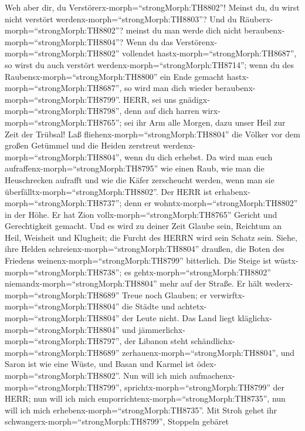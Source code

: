  Weh aber dir, du Verstörerx-morph=``strongMorph:TH8802''!
Meinst du, du wirst nicht verstört werdenx-morph=``strongMorph:TH8803''?
Und du Räuberx-morph=``strongMorph:TH8802''? meinst du man werde dich
nicht beraubenx-morph=``strongMorph:TH8804''? Wenn du das
Verstörenx-morph=``strongMorph:TH8802'' vollendet
hastx-morph=``strongMorph:TH8687'', so wirst du auch verstört
werdenx-morph=``strongMorph:TH8714''; wenn du des
Raubensx-morph=``strongMorph:TH8800'' ein Ende gemacht
hastx-morph=``strongMorph:TH8687'', so wird man dich wieder
beraubenx-morph=``strongMorph:TH8799''.  HERR, sei uns
gnädigx-morph=``strongMorph:TH8798'', denn auf dich harren
wirx-morph=``strongMorph:TH8765''; sei ihr Arm alle Morgen, dazu unser
Heil zur Zeit der Trübsal!  Laß
fliehenx-morph=``strongMorph:TH8804'' die Völker vor dem großen Getümmel
und die Heiden zerstreut werdenx-morph=``strongMorph:TH8804'', wenn du
dich erhebst.  Da wird man euch
aufraffenx-morph=``strongMorph:TH8795'' wie einen Raub, wie man die
Heuschrecken aufrafft und wie die Käfer zerscheucht werden, wenn man sie
überfälltx-morph=``strongMorph:TH8802''.  Der HERR ist
erhabenx-morph=``strongMorph:TH8737''; denn er
wohntx-morph=``strongMorph:TH8802'' in der Höhe. Er hat Zion
vollx-morph=``strongMorph:TH8765'' Gericht und Gerechtigkeit gemacht.
 Und es wird zu deiner Zeit Glaube sein, Reichtum an Heil,
Weisheit und Klugheit; die Furcht des HERRN wird sein Schatz sein.
 Siehe, ihre Helden schreienx-morph=``strongMorph:TH8804''
draußen, die Boten des Friedens weinenx-morph=``strongMorph:TH8799''
bitterlich.  Die Steige ist
wüstx-morph=``strongMorph:TH8738''; es
gehtx-morph=``strongMorph:TH8802'' niemandx-morph=``strongMorph:TH8804''
mehr auf der Straße. Er hält wederx-morph=``strongMorph:TH8689'' Treue
noch Glauben; er verwirftx-morph=``strongMorph:TH8804'' die Städte und
achtetx-morph=``strongMorph:TH8804'' der Leute nicht.  Das
Land liegt kläglichx-morph=``strongMorph:TH8804'' und
jämmerlichx-morph=``strongMorph:TH8797'', der Libanon steht
schändlichx-morph=``strongMorph:TH8689''
zerhauenx-morph=``strongMorph:TH8804'', und Saron ist wie eine Wüste,
und Basan und Karmel ist ödex-morph=``strongMorph:TH8802''.
 Nun will ich mich aufmachenx-morph=``strongMorph:TH8799'',
sprichtx-morph=``strongMorph:TH8799'' der HERR; nun will ich mich
emporrichtenx-morph=``strongMorph:TH8735'', nun will ich mich
erhebenx-morph=``strongMorph:TH8735''.  Mit Stroh gehet ihr
schwangerx-morph=``strongMorph:TH8799'', Stoppeln gebäret
